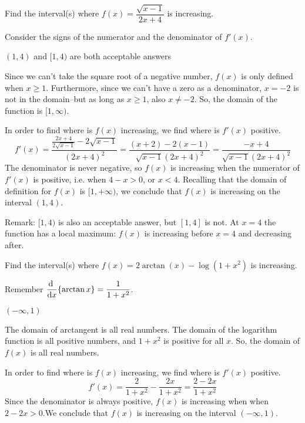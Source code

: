 \begin{question}[2015Q] Find the interval(s) where $f(x)=\dfrac{\sqrt{x-1}}{2x+4}$ is increasing.
\end{question}
\begin{hint}
Consider the signs of the numerator and the denominator of $f'(x)$.
\end{hint}
\begin{answer}
$(1,4)$ and $[1,4)$ are both acceptable answers
\end{answer}
\begin{solution}
Since we can't take the square root of a negative number,  $f(x)$ is only defined
when $x \ge 1$. Furthermore, since we can't have a zero as a denominator, $x=-2$ is  not in the domain--but as long as $x \ge 1$, also $x \ne -2$. So, the domain of the function is $[1,\infty)$.

 In order to find where is $f(x)$ increasing, we find where is $f'(x)$ positive.
$$f'(x)=\frac{\frac{2x+4}{2\sqrt{x-1}}-2\sqrt{x-1}}{(2x+4)^2}=\frac{(x+2)-2(x-1)}{\sqrt{x-1}(2x+4)^2}
=\frac{-x+4}{\sqrt{x-1}(2x+4)^2}$$
The denominator is never negative, so  $f(x)$ is increasing when the numerator of $f'(x)$ is positive, i.e. when $4-x>0$, or $x<4$. Recalling that the domain of definition for $f(x)$ is $[1,+\infty)$, we conclude that $f(x)$ is increasing on the interval $(1,4)$.

Remark: $[1,4)$ is also an acceptable answer, but $[1,4]$ is not. At $x=4$ the function has a local maximum: $f(x)$ is increasing before $x=4$ and decreasing after.
\end{solution}


\begin{Mquestion}[2015Q]
Find the interval(s) where $f(x)=2\arctan (x) - \log(1+x^2)$ is increasing.
\end{Mquestion}
\begin{hint}
Remember $\ds\diff{}{x}\{\arctan x\}=\dfrac{1}{1+x^2}$.
\end{hint}
\begin{answer} $(-\infty,1)$
\end{answer}
\begin{solution}
The domain of arctangent is all real numbers. The domain of the logarithm function is all positive numbers, and $1+x^2$ is positive for all $x$. So, the domain of $f(x)$ is all real numbers.

In order to find where is $f(x)$ increasing, we find where is $f'(x)$ positive.
$$f'(x)= \frac 2 {1+x^2} - \frac{2x}{1+x^2} = \frac{2-2x}{1+x^2}$$
Since the denominator is always positive, $f(x)$ is increasing
when when $2-2x>0$.We conclude that $f(x)$ is increasing on the interval $(-\infty,1)$.
\end{solution}
